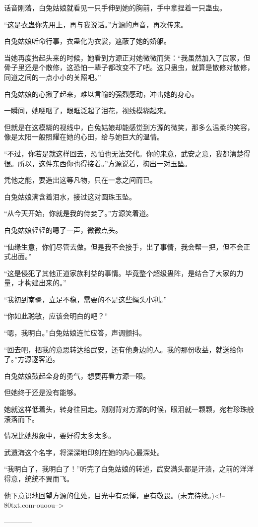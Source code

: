 \begin{this_body}
话音刚落，白兔姑娘就看见一只手伸到她的胸前，手中拿捏着一只蛊虫。

“这是衣蛊你先用上，再与我说话。”方源的声音，再次传来。

白兔姑娘听命行事，衣蛊化为衣裳，遮蔽了她的娇躯。

当她再度抬起头来的时候，她看到方源正对她微微而笑：“我虽然加入了武家，但骨子里还是个散修，这恐怕一辈子都改变不了吧。这只蛊虫，就算是散修对散修，同道之间的一点小小的关照吧。”

白兔姑娘的心揪了起来，难以言喻的强烈感动，冲击她的身心。

一瞬间，她哽咽了，眼眶泛起了泪花，视线模糊起来。

但就是在这模糊的视线中，白兔姑娘却能感觉到方源的微笑，那多么温柔的笑容，像是太阳一般照耀在她的心田，给与她巨大的温情。

“不过，你若是就这样回去，恐怕也无法交代。你的来意，武安之意，我都清楚得很。所以，这件东西你也得接着。”方源说着，掏出一对玉坠。

凭他之能，要造出这等凡物，只在一念之间而已。

白兔姑娘满含着泪水，接过这对圆珠玉坠。

“从今天开始，你就是我的侍妾了。”方源笑着道。

白兔姑娘轻轻的嗯了一声，微微点头。

“仙缘生意，你们尽管去做。但是我不会接手，出了事情，我会帮一把，但不会正式出面。”

“这是侵犯了其他正道家族利益的事情。毕竟整个超级蛊阵，是结合了大家的力量，才构建出来的。”

“我初到南疆，立足不稳，需要的不是这些蝇头小利。”

“你如此聪敏，应该会明白的吧？”

“嗯，我明白。”白兔姑娘连忙应答，声调颤抖。

“回去吧，把我的意思转达给武安，还有他身边的人。我的那份收益，就送给你了。”方源逐客道。

白兔姑娘鼓起全身的勇气，想要再看方源一眼。

但她终于还是没有能够。

她就这样低着头，转身往回走。刚刚背对方源的时候，眼泪就一颗颗，宛若珍珠般滚落而下。

情况比她想象中，要好得太多太多。

武遗海这个名字，将深深地印刻在她的内心最深处。

“我明白了，我明白了！”听完了白兔姑娘的转述，武安满头都是汗渍，之前的洋洋得意，统统不翼而飞。

他下意识地回望方源的住处，目光中有忌惮，更有敬畏。(未完待续。)<!--80txt.com-ouoou-->

------------

\end{this_body}

